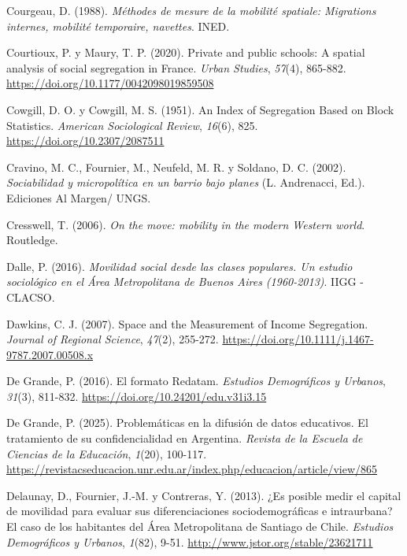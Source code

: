 \documentclass[
  spanish,
  a4paper,%
  chapterprefix=true,%
  DIV=calc,%
  twoside]{scrbook}%
\newlength{\cslhangindent}
\newenvironment{CSLReferences}[2] %
 {\begin{list}{}{%
  \setlength{\itemindent}{0pt}
  \setlength{\leftmargin}{0pt}
  \setlength{\parsep}{0pt}
  \ifodd #1
   \setlength{\leftmargin}{\cslhangindent}
   \setlength{\itemindent}{-1\cslhangindent}
  \fi
  \setlength{\itemsep}{#2\baselineskip}}}
 {\end{list}}
\begin{document}
\begin{CSLReferences}{1}{0}
Courgeau, D. (1988). \emph{Méthodes de mesure de la mobilité spatiale: Migrations internes, mobilité temporaire, navettes}. INED.

Courtioux, P. y Maury, T. P. (2020). Private and public schools: A spatial analysis of social segregation in France. \emph{Urban Studies}, \emph{57}(4), 865-882. \url{https://doi.org/10.1177/0042098019859508}

Cowgill, D. O. y Cowgill, M. S. (1951). An Index of Segregation Based on Block Statistics. \emph{American Sociological Review}, \emph{16}(6), 825. \url{https://doi.org/10.2307/2087511}

Cravino, M. C., Fournier, M., Neufeld, M. R. y Soldano, D. C. (2002). \emph{Sociabilidad y micropolítica en un barrio bajo planes} (L. Andrenacci, Ed.). Ediciones Al Margen/ UNGS.

Cresswell, T. (2006). \emph{On the move: mobility in the modern Western world}. Routledge.

Dalle, P. (2016). \emph{Movilidad social desde las clases populares. Un estudio sociológico en el Área Metropolitana de Buenos Aires (1960-2013)}. IIGG - CLACSO.

Dawkins, C. J. (2007). Space and the Measurement of Income Segregation. \emph{Journal of Regional Science}, \emph{47}(2), 255-272. \url{https://doi.org/10.1111/j.1467-9787.2007.00508.x}

De Grande, P. (2016). El formato Redatam. \emph{Estudios Demográficos y Urbanos}, \emph{31}(3), 811-832. \url{https://doi.org/10.24201/edu.v31i3.15}

De Grande, P. (2025). Problemáticas en la difusión de datos educativos. El tratamiento de su confidencialidad en Argentina. \emph{Revista de la Escuela de Ciencias de la Educación}, \emph{1}(20), 100-117. \url{https://revistacseducacion.unr.edu.ar/index.php/educacion/article/view/865}

Delaunay, D., Fournier, J.-M. y Contreras, Y. (2013). ¿Es posible medir el capital de movilidad para evaluar sus diferenciaciones sociodemográficas e intraurbana? El caso de los habitantes del Área Metropolitana de Santiago de Chile. \emph{Estudios Demográficos y Urbanos}, \emph{1}(82), 9-51. \url{http://www.jstor.org/stable/23621711}


\end{CSLReferences}
\end{document}
